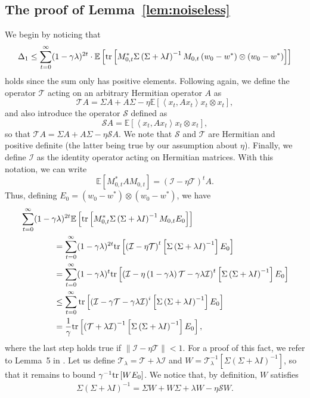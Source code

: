 \documentclass[final,12pt]{colt2018} %
\newcommand{\Sw}{\mathcal{S}}
\newcommand{\TT}{\mathcal{T}}
\newcommand{\Iw}{\mathcal{I}}
\newcommand{\trace}[1]{\mbox{\normalfont tr}\left[#1\right]}
\newcommand{\EE}[1]{\mathbb{E}\left[#1\right]}
\newcommand{\norm}[1]{\left\|#1\right\|}
\newcommand{\pa}[1]{\left(#1\right)}
\newcommand{\iprod}[2]{\left\langle#1, #2\right\rangle}
\begin{document}
\subsection{The proof of Lemma~\ref{lem:noiseless}}\label{app:noiseless}
We begin by noticing that 
\[
 \Delta_1
 \le
 \sum_{t=0}^\infty (1-\gamma\lambda)^{2t} \cdot \EE{\trace{M_{0,t}^* \Sigma \pa{\Sigma + \lambda I}^{-1} M_{0,t} \pa{w_0 - w^*}\otimes 
\pa{w_0 - w^*}}}
\]
holds since the sum only has positive elements.
Following \citet{DFB16} again, we define the operator $\TT$ acting on an arbitrary Hermitian operator $A$ as
\[
 \TT A = \Sigma A + A \Sigma - \eta \EE{\iprod{x_t}{A x_t} x_t\otimes x_t},
\]
and also introduce the operator $\Sw$ defined as
\[
 \Sw A = \EE{\iprod{x_t}{A x_t} x_t\otimes x_t},
\]
so that $\TT A = \Sigma A + A \Sigma - \eta \Sw A$. We note that $\Sw$ and $\TT$ are Hermitian and positive definite (the latter being true 
by our assumption about $\eta$). Finally, we define $\Iw$ as the identity operator acting on Hermitian matrices. With this notation, we can 
write
\[
 \EE{M_{0,t}^*A M_{0,t}} = \pa{\Iw - \eta \TT}^t A.
\]
Thus, defining $E_0 = \pa{w_0 - w^*}\otimes\pa{w_0 - w^*}$, we have
\begin{align*}
 &\sum_{t=0}^\infty (1-\gamma\lambda)^{2t} \EE{\trace{M_{0,t}^* \Sigma \pa{\Sigma + \lambda I}^{-1} M_{0,t} E_0}} 
 \\
 &\qquad \qquad =
 \sum_{t=0}^\infty (1-\gamma\lambda)^{2t} \trace{\pa{\Iw - \eta \TT}^{t} \left[\Sigma \pa{\Sigma + \lambda I}^{-1}\right] E_0}
 \\
 &\qquad \qquad =
 \sum_{t=0}^\infty (1-\gamma\lambda)^{t} \trace{\pa{\Iw - \eta\pa{1-\gamma\lambda} \TT - \gamma\lambda \Iw}^{t} \left[\Sigma 
\pa{\Sigma + \lambda I}^{-1}\right] E_0}
\\
 &\qquad \qquad \le
 \sum_{t=0}^\infty \trace{\pa{\Iw - \gamma \TT - \gamma\lambda \Iw}^{i} \left[\Sigma \pa{\Sigma + \lambda I}^{-1}\right] E_0}
 \\
 &\qquad \qquad =
 \frac{1}{\gamma}\trace{\pa{\TT + \lambda \Iw}^{-1}\left[\Sigma \pa{\Sigma + \lambda I}^{-1}\right] E_0},
\end{align*}
where the last step holds true if $\norm{\Iw - \eta \TT} < 1$. For a proof of this fact, we refer to Lemma~5 in \citet{DB15}.
Let us define $\TT_\lambda = \TT + \lambda \Iw$ and $W = \TT_\lambda^{-1}\left[\Sigma \pa{\Sigma + \lambda I}^{-1}\right]$, so that it 
remains to bound $ \gamma^{-1} \trace{WE_0}$. We notice that, by definition, $W$ satisfies
\begin{align}\label{eq:sigma-W}
 \Sigma \pa{\Sigma + \lambda I}^{-1} = \Sigma W + W \Sigma + \lambda W - \eta \Sw W.
\end{align}
\end{document}
